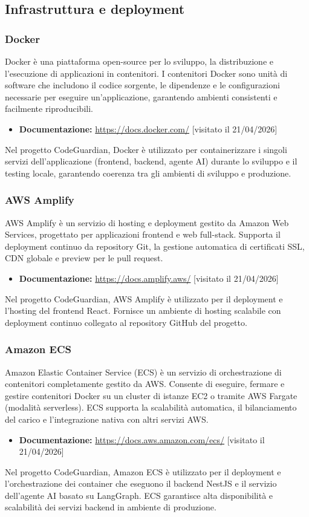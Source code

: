 \documentclass[a4paper, 11pt]{article}
\begin{document}
\subsection{Infrastruttura e deployment}

\subsubsection{Docker}
Docker è una piattaforma open-source per lo sviluppo, la distribuzione e l'esecuzione di applicazioni in contenitori. I contenitori Docker sono unità di software che includono il codice sorgente, le dipendenze e le configurazioni necessarie per eseguire un'applicazione, garantendo ambienti consistenti e facilmente riproducibili.
\begin{itemize}
  \item \textbf{Documentazione:} \url{https://docs.docker.com/} [visitato il 21/04/2026]
\end{itemize}
Nel progetto CodeGuardian, Docker è utilizzato per containerizzare i singoli servizi dell'applicazione (frontend, backend, agente AI) durante lo sviluppo e il testing locale, garantendo coerenza tra gli ambienti di sviluppo e produzione.

\subsubsection{AWS Amplify}
AWS Amplify è un servizio di hosting e deployment gestito da Amazon Web Services, progettato per applicazioni frontend e web full-stack. Supporta il deployment continuo da repository Git, la gestione automatica di certificati SSL, CDN globale e preview per le pull request.
\begin{itemize}
  \item \textbf{Documentazione:} \url{https://docs.amplify.aws/} [visitato il 21/04/2026]
\end{itemize}
Nel progetto CodeGuardian, AWS Amplify è utilizzato per il deployment e l'hosting del frontend React. Fornisce un ambiente di hosting scalabile con deployment continuo collegato al repository GitHub del progetto.

\subsubsection{Amazon ECS}
Amazon Elastic Container Service (ECS) è un servizio di orchestrazione di contenitori completamente gestito da AWS\@. Consente di eseguire, fermare e gestire contenitori Docker su un cluster di istanze EC2 o tramite AWS Fargate (modalità serverless). ECS supporta la scalabilità automatica, il bilanciamento del carico e l'integrazione nativa con altri servizi AWS\@.
\begin{itemize}
  \item \textbf{Documentazione:} \url{https://docs.aws.amazon.com/ecs/} [visitato il 21/04/2026]
\end{itemize}
Nel progetto CodeGuardian, Amazon ECS è utilizzato per il deployment e l'orchestrazione dei container che eseguono il backend NestJS e il servizio dell'agente AI basato su LangGraph. ECS garantisce alta disponibilità e scalabilità dei servizi backend in ambiente di produzione.
\end{document}
